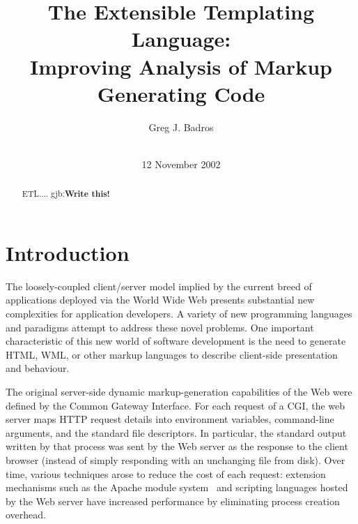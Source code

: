 \documentclass{www2003-submission}
\newcommand{\B}{\discretionary{}{}{}}
\newcommand{\gjb}[1]{{\sc gjb:}\textbf{#1}}
\begin{document}
%
\title{The Extensible Templating Language: \\
       Improving Analysis of Markup Generating Code}


\author{
%
\alignauthor Greg J. Badros\\
       \\
}
\date{12 November 2002}
\maketitle
\begin{abstract}
ETL.... \gjb{Write this!}

\end{abstract}




\section{Introduction}
\label{sec-intro}

The loosely-coupled client/\B{}server model implied by the current
breed of applications deployed via the World Wide Web presents
substantial new complexities for application developers. A variety of
new programming languages and paradigms attempt to address these novel
problems.  One important characteristic of this new world of software
development is the need to generate HTML, WML, or other markup
languages to describe client-side presentation and behaviour.

The original server-side dynamic markup-generation capabilities of the
Web were defined by the Common Gateway Interface.\cite{CGI11} For each
request of a CGI, the web server maps HTTP request details into environment
variables, command-line arguments, and the standard file descriptors.
In particular, the standard output written by that process was sent by
the Web server as the response to the client browser (instead of
simply responding with an unchanging file from disk).  Over time,
various techniques arose to reduce the cost of each request: extension
mechanisms such as the Apache module system~\cite{Apache} and
scripting languages hosted by the Web server have increased
performance by eliminating process creation overhead.
\end{document}
